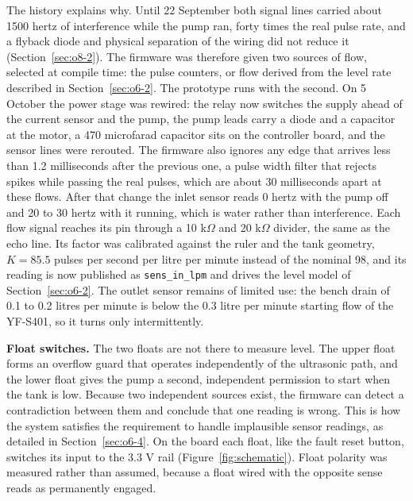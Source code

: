 The history explains why. Until 22 September both signal lines carried about 1500 hertz of interference while the pump ran, forty times the real pulse rate, and a flyback diode and physical separation of the wiring did not reduce it (Section~\ref{sec:o8-2}). The firmware was therefore given two sources of flow, selected at compile time: the pulse counters, or flow derived from the level rate described in Section~\ref{sec:o6-2}. The prototype runs with the second. On 5 October the power stage was rewired: the relay now switches the supply ahead of the current sensor and the pump, the pump leads carry a diode and a capacitor at the motor, a 470 microfarad capacitor sits on the controller board, and the sensor lines were rerouted. The firmware also ignores any edge that arrives less than 1.2 milliseconds after the previous one, a pulse width filter that rejects spikes while passing the real pulses, which are about 30 milliseconds apart at these flows. After that change the inlet sensor reads 0 hertz with the pump off and 20 to 30 hertz with it running, which is water rather than interference. Each flow signal reaches its pin through a 10 k$\Omega$ and 20 k$\Omega$ divider, the same as the echo line. Its factor was calibrated against the ruler and the tank geometry, $K = 85.5$ pulses per second per litre per minute instead of the nominal 98, and its reading is now published as \texttt{sens\_in\_lpm} and drives the level model of Section~\ref{sec:o6-2}. The outlet sensor remains of limited use: the bench drain of 0.1 to 0.2 litres per minute is below the 0.3 litre per minute starting flow of the YF-S401, so it turns only intermittently.

\textbf{Float switches.} The two floats are not there to measure level. The upper float forms an overflow guard that operates independently of the ultrasonic path, and the lower float gives the pump a second, independent permission to start when the tank is low. Because two independent sources exist, the firmware can detect a contradiction between them and conclude that one reading is wrong. This is how the system satisfies the requirement to handle implausible sensor readings, as detailed in Section~\ref{sec:o6-4}. On the board each float, like the fault reset button, switches its input to the 3.3 V rail (Figure~\ref{fig:schematic}). Float polarity was measured rather than assumed, because a float wired with the opposite sense reads as permanently engaged.

